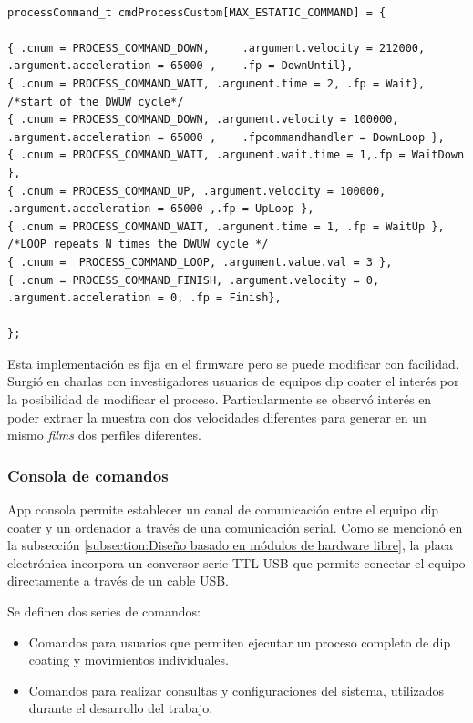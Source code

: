 


\begin{lstlisting}[label=cod:vEstructuraCode,caption=Proceso completo de dip coating.] % 

processCommand_t cmdProcessCustom[MAX_ESTATIC_COMMAND] = {

{ .cnum = PROCESS_COMMAND_DOWN, 	.argument.velocity = 212000,	.argument.acceleration = 65000 , 	.fp = DownUntil},
{ .cnum = PROCESS_COMMAND_WAIT, .argument.time = 2,	.fp = Wait},
/*start of the DWUW cycle*/
{ .cnum = PROCESS_COMMAND_DOWN, .argument.velocity = 100000,	.argument.acceleration = 65000 , 	.fpcommandhandler = DownLoop },
{ .cnum = PROCESS_COMMAND_WAIT, .argument.wait.time = 1,.fp = WaitDown },
{ .cnum = PROCESS_COMMAND_UP, .argument.velocity = 100000, .argument.acceleration = 65000 ,.fp = UpLoop },
{ .cnum = PROCESS_COMMAND_WAIT, .argument.time = 1, .fp = WaitUp },
/*LOOP repeats N times the DWUW cycle */
{ .cnum =  PROCESS_COMMAND_LOOP, .argument.value.val = 3 },
{ .cnum = PROCESS_COMMAND_FINISH, .argument.velocity = 0, .argument.acceleration = 0, .fp = Finish},

};

\end{lstlisting}





Esta implementación es fija en el firmware pero se puede modificar con facilidad. Surgió en charlas con investigadores usuarios de equipos dip coater el interés por la posibilidad de modificar el proceso. Particularmente se observó interés en poder extraer la muestra con dos velocidades diferentes para generar en un mismo \textit{films} dos perfiles diferentes.


\subsubsection{Consola de comandos}
\label{sec:consola_comandos}

App consola permite establecer un canal de comunicación entre el equipo dip coater y un ordenador a través de una comunicación serial. Como se mencionó en la subsección \ref{subsection:Diseño basado en módulos de hardware libre}, la placa electrónica incorpora un conversor serie TTL-USB que permite conectar el  equipo directamente a través de un cable USB. 

Se definen dos series de comandos:
\begin{itemize}
\item Comandos para usuarios que permiten ejecutar un proceso completo de dip coating y movimientos individuales.
\item Comandos para realizar consultas y configuraciones del sistema, utilizados durante el desarrollo del trabajo.
\end{itemize}

